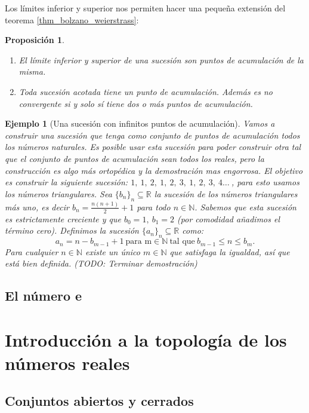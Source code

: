 \documentclass{article}
\newtheorem{prop}{Proposición}
\newtheorem{ejem}{Ejemplo}
\newcommand{\reales}{\mathbb{R}}
\newcommand{\naturales}{\mathbb{N}}
\newcommand{\sucreal}[1]{\{ #1 _n \}_n \subseteq \reales}
\begin{document}
Los límites inferior y superior nos permiten hacer una pequeña extensión del teorema \eqref{thm_bolzano_weierstrass}:
\begin{prop}
\begin{enumerate}
\item
	El límite inferior y superior de una sucesión son puntos de acumulación de la misma.
\item
	Toda sucesión acotada tiene un punto de acumulación. Además es no convergente si y solo sí tiene dos o más puntos de acumulación.
\end{enumerate}
\end{prop}

\begin{ejem}[Una sucesión con infinitos puntos de acumulación]
	Vamos a construir una sucesión que tenga como conjunto de puntos de acumulación todos los números naturales. Es posible usar esta sucesión para poder construir otra tal que el conjunto de puntos de acumulación sean todos los reales, pero la construcción es algo más ortopédica y la demostración mas engorrosa.
	El objetivo es construir la siguiente sucesión: $1,\ 1,\ 2,\ 1,\ 2,\ 3,\ 1,\ 2,\ 3,\ 4 \ldots\ $, para esto usamos los números triangulares.
	Sea $\sucreal{b}$ la sucesión de los números triangulares más uno, es decir $b_n = \frac{n(n+1)}{2} + 1$ para todo $n \in \naturales$. Sabemos que esta sucesión es estrictamente creciente y que $b_0 = 1,\ b_1 = 2$ (por comodidad añadimos el término cero). Definimos la sucesión $\sucreal{a}$ como:
	\begin{equation*}
		a_n = n - b_{m-1} + 1\ \text{para m} \in \naturales\ \text{tal que}\ b_{m-1} \leq n \leq b_m \text{.}
	\end{equation*}
	Para cualquier $n \in \naturales$ existe un único $m \in \naturales$ que satisfaga la igualdad, así que está bien definida. (TODO: Terminar demostración)
\end{ejem}


\subsection{El número e}



\section{Introducción a la topología de los números reales}

\subsection{Conjuntos abiertos y cerrados}
\end{document}
